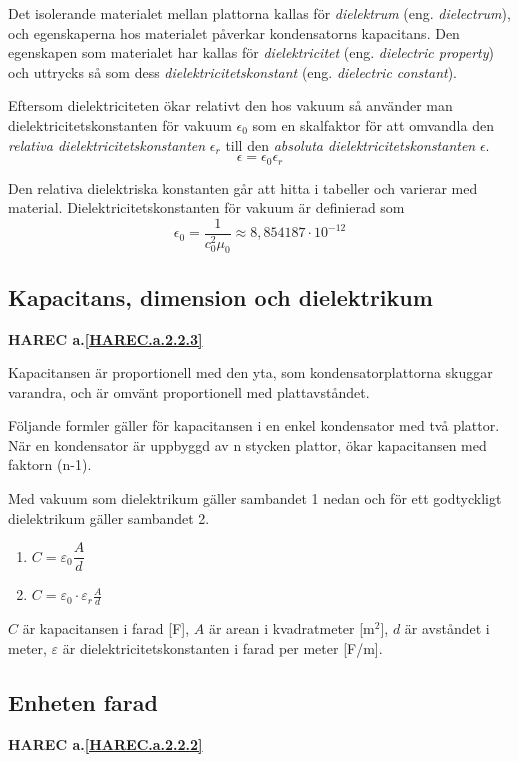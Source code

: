 Det isolerande materialet mellan plattorna kallas för \emph{dielektrum}
(eng. \emph{dielectrum}), och egenskaperna hos materialet påverkar kondensatorns
kapacitans.
Den egenskapen som materialet har kallas för \emph{dielektricitet}
(eng. \emph{dielectric property}) och uttrycks så som dess
\emph{dielektricitetskonstant} (eng. \emph{dielectric constant}).

Eftersom dielektriciteten ökar relativt den hos vakuum så använder man
dielektricitetskonstanten för vakuum \(\epsilon_0\) som en skalfaktor för att
omvandla den \emph{relativa dielektricitetskonstanten} \(\epsilon_r\) till den
\emph{absoluta dielektricitetskonstanten} \(\epsilon\).
\[
  \epsilon = \epsilon_0\epsilon_r
\]

Den relativa dielektriska konstanten går att hitta i tabeller och varierar
med material. Dielektricitetskonstanten för vakuum är definierad som
\[
  \epsilon_0 = \dfrac{1}{c_0^2\mu_0} \approx 8,854187 \cdot 10^{-12}
\]

\subsection{Kapacitans, dimension och dielektrikum}
\textbf{HAREC a.\ref{HAREC.a.2.2.3}\label{myHAREC.a.2.2.3}}

Kapacitansen är proportionell med den yta, som kondensatorplattorna skuggar
varandra, och är omvänt proportionell med plattavståndet.

Följande formler gäller för kapacitansen i en enkel kondensator med två
plattor. När en kondensator är uppbyggd av n stycken plattor, ökar kapacitansen
med faktorn (n-1).

Med vakuum som dielektrikum gäller sambandet 1 nedan och för ett godtyckligt
dielektrikum gäller sambandet 2.

\begin{enumerate}
  \item \(C = \varepsilon _0 \dfrac{A}{d}\)
  \item \(C = \varepsilon _0 \cdot \varepsilon _r \frac{A}{d}\)
\end{enumerate}

\(C\) är kapacitansen i farad [F], \(A\) är arean i kvadratmeter [m$^2$], $d$ är
avståndet i meter, $\varepsilon$ är dielektricitetskonstanten i farad per meter
[F/m].

\subsection{Enheten farad}
\textbf{HAREC a.\ref{HAREC.a.2.2.2}\label{myHAREC.a.2.2.2}}

